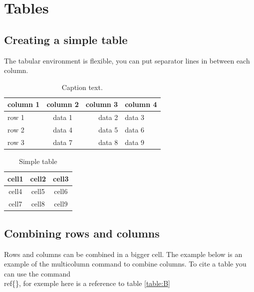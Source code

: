 \documentclass[Theme1]{{template_material/eurostat}}
\begin{document}
\section{Tables}

\subsection{Creating a simple table}
The tabular environment is flexible, you can put separator lines in between each column.

\begin{table}[h]
\caption{Caption text.\label{tab1}}

\begin{tabular}{@{}l|crl@{}}
column 1 & column 2  & column 3 &   column 4\\\hline
row 1    & data 1   & data 2  & data 3  \\
row 2    & data 4   & data 5  & data 6  \\
row 3    & data 7   & data 8  & data 9  \\\hline
\end{tabular}
\end{table}

\begin{table}[h]
 \caption{Simple table}
 \label{table:A}
    \begin{tabular}{ c|c|c } 
     \hline
     cell1 & cell2 & cell3 \\ 
     \hline
     cell4 & cell5 & cell6 \\ 
     \hline
     cell7 & cell8 & cell9 \\ 
     \hline
    \end{tabular}
\end{table}

\subsection{Combining rows and columns}

Rows and columns can be combined in a bigger cell. The example below is an example of the multicolumn command to combine columns. To cite a table you can use the command \\ref\{\}, for exemple here is a reference to table \ref{table:B}
\end{document}
